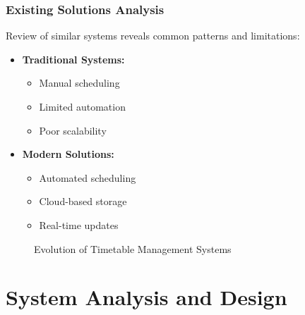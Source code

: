 \documentclass[12pt,a4paper]{report}
\begin{document}
\subsection{Existing Solutions Analysis}
Review of similar systems reveals common patterns and limitations:

\begin{itemize}
    \item \textbf{Traditional Systems:}
        \begin{itemize}
            \item Manual scheduling
            \item Limited automation
            \item Poor scalability
        \end{itemize}
    \item \textbf{Modern Solutions:}
        \begin{itemize}
            \item Automated scheduling
            \item Cloud-based storage
            \item Real-time updates
        \end{itemize}
\end{itemize}

\begin{figure}[H]
\centering
{}
\caption{Evolution of Timetable Management Systems}
\label{fig:evolution}
\end{figure}

\chapter{System Analysis and Design}
\end{document}
